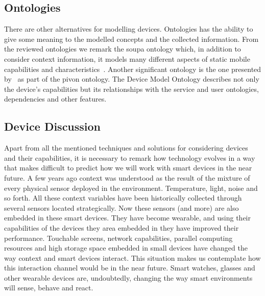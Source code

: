 \subsection{Ontologies}

There are other alternatives for modelling devices. Ontologies has the ability to
give some meaning to the modelled concepts and the collected information. From the 
reviewed ontologies we remark the \ac{soupa} ontology which, in addition to consider 
context information, it models many different aspects of static mobile capabilities 
and characteristics~\citep{chen_soupa_2004}. Another significant ontology is the 
one presented by~\citet{hervas_context_2010} as part of the \ac{pivon} ontology. 
The Device Model Ontology describes not only the device's capabilities but its 
relationships with the service and user ontologies, dependencies and other features.

\subsection{Device Discussion}
\label{sec:device_discussion}

Apart from all the mentioned techniques and solutions for considering devices and 
their capabilities, it is necessary to remark how technology evolves in a way that 
makes difficult to predict how we will work with smart devices in the near future. 
A few years ago context was understood as the result of the mixture of every 
physical sensor deployed in the environment. Temperature, light, noise and so 
forth. All these context variables have been historically collected through several 
sensors located strategically. Now these sensors (and more) are also embedded in 
these smart devices. They have become wearable, and using their capabilities of 
the devices they area embedded in they have improved their performance. Touchable 
screens, network capabilities, parallel computing resources and high storage space 
embedded in small devices have changed the way context and smart devices interact. 
This situation makes us contemplate how this interaction channel would be in the 
near future. Smart watches, glasses and other wearable devices are, undoubtedly, 
changing the way smart environments will sense, behave and react.


